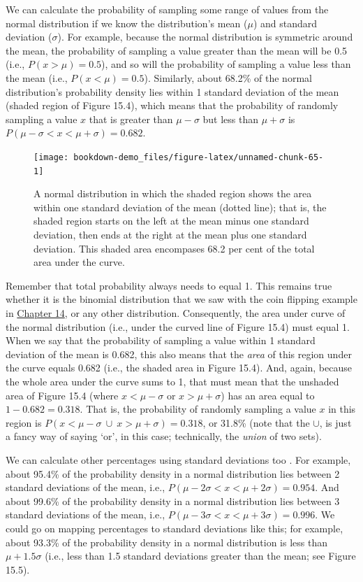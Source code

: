 \documentclass[
]{scrbook}
\begin{document}
We can calculate the probability of sampling some range of values from the normal distribution if we know the distribution's mean (\(\mu\)) and standard deviation (\(\sigma\)).
For example, because the normal distribution is symmetric around the mean, the probability of sampling a value greater than the mean will be 0.5 (i.e., \(P(x > \mu) = 0.5\)), and so will the probability of sampling a value less than the mean (i.e., \(P(x < \mu) = 0.5\)).
Similarly, about 68.2\% of the normal distribution's probability density lies within 1 standard deviation of the mean (shaded region of Figure 15.4), which means that the probability of randomly sampling a value \(x\) that is greater than \(\mu - \sigma\) but less than \(\mu + \sigma\) is \(P(\mu - \sigma < x < \mu + \sigma) = 0.682\).

\begin{figure}
\texttt{[image: bookdown-demo\_files/figure-latex/unnamed-chunk-65-1]} \caption{A normal distribution in which the shaded region shows the area within one standard deviation of the mean (dotted line); that is, the shaded region starts on the left at the mean minus one standard deviation, then ends at the right at the mean plus one standard deviation. This shaded area encompases 68.2 per cent of the total area under the curve.}\label{fig:unnamed-chunk-65}
\end{figure}

Remember that total probability always needs to equal 1.
This remains true whether it is the binomial distribution that we saw with the coin flipping example in \protect\hyperlink{Chapter_14}{Chapter 14}, or any other distribution.
Consequently, the area under curve of the normal distribution (i.e., under the curved line of Figure 15.4) must equal 1.
When we say that the probability of sampling a value within 1 standard deviation of the mean is 0.682, this also means that the \emph{area} of this region under the curve equals 0.682 (i.e., the shaded area in Figure 15.4).
And, again, because the whole area under the curve sums to 1, that must mean that the unshaded area of Figure 15.4 (where \(x < \mu -\sigma\) or \(x > \mu + \sigma\)) has an area equal to \(1 - 0.682 = 0.318\).
That is, the probability of randomly sampling a value \(x\) in this region is \(P(x < \mu - \sigma \: \cup \: x > \mu + \sigma) = 0.318\), or 31.8\% (note that the \(\cup\), is just a fancy way of saying `or', in this case; technically, the \emph{union} of two sets).

We can calculate other percentages using standard deviations too \citep{Sokal1995}.
For example, about 95.4\% of the probability density in a normal distribution lies between 2 standard deviations of the mean, i.e., \(P(\mu - 2\sigma < x < \mu + 2\sigma) = 0.954\).
And about 99.6\% of the probability density in a normal distribution lies between 3 standard deviations of the mean, i.e., \(P(\mu - 3\sigma < x < \mu + 3\sigma) = 0.996\).
We could go on mapping percentages to standard deviations like this; for example, about 93.3\% of the probability density in a normal distribution is less than \(\mu + 1.5\sigma\) (i.e., less than 1.5 standard deviations greater than the mean; see Figure 15.5).
\end{document}
